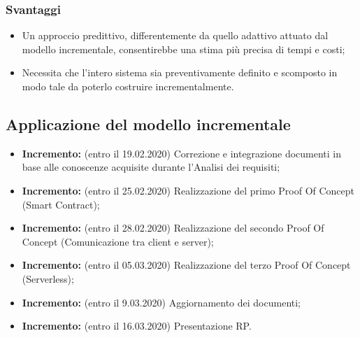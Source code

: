\subsubsection{Svantaggi}
\begin{itemize}
	\item Un approccio predittivo, differentemente da quello adattivo attuato dal modello incrementale, consentirebbe una stima più precisa di tempi e costi;
	\item Necessita che l'intero sistema sia preventivamente definito e scomposto in modo tale da poterlo costruire incrementalmente.
\end{itemize}
\subsection{Applicazione del modello incrementale}
\begin{itemize}
	\item \textbf{ Incremento:} (entro il 19.02.2020) Correzione e integrazione documenti in base alle conoscenze acquisite durante l'Analisi dei requisiti;
	\item \textbf{ Incremento:} (entro il 25.02.2020) Realizzazione del primo Proof Of Concept (Smart Contract);
	\item \textbf{ Incremento:} (entro il 28.02.2020) Realizzazione del secondo Proof Of Concept (Comunicazione tra client e server);
	\item \textbf{ Incremento:} (entro il 05.03.2020) Realizzazione del terzo Proof Of Concept (Serverless);
	\item \textbf{ Incremento:} (entro il 9.03.2020) Aggiornamento dei documenti;
	\item \textbf{ Incremento:} (entro il 16.03.2020) Presentazione RP.
\end{itemize}

